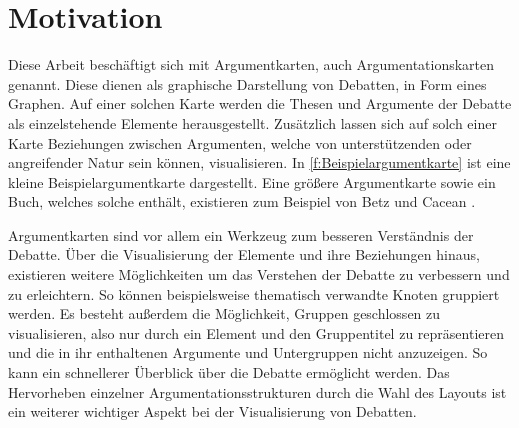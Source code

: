 \chapter{Motivation}
Diese Arbeit beschäftigt sich mit Argumentkarten, auch Argumentationskarten genannt.
Diese dienen als graphische Darstellung von Debatten, in Form eines Graphen.
Auf einer solchen Karte werden die Thesen und Argumente der Debatte als einzelstehende Elemente herausgestellt. 
Zusätzlich lassen sich auf solch einer Karte Beziehungen zwischen Argumenten, welche von unterstützenden oder angreifender Natur sein können, visualisieren.
In \autoref{f:Beispielargumentkarte} ist eine kleine Beispielargumentkarte dargestellt. 
Eine größere Argumentkarte sowie ein Buch, welches solche enthält, existieren zum Beispiel von Betz und Cacean \cite{ClimateEngineering, betz2012ethical}.



Argumentkarten sind vor allem ein Werkzeug zum besseren Verständnis der Debatte. 
Über die Visualisierung der Elemente und ihre Beziehungen hinaus, existieren weitere Möglichkeiten um das Verstehen der Debatte zu verbessern und zu erleichtern.
So können beispielsweise thematisch verwandte Knoten gruppiert werden. 
Es besteht außerdem die Möglichkeit, Gruppen geschlossen zu visualisieren, also nur durch ein
Element und den Gruppentitel zu repräsentieren und  die in ihr enthaltenen Argumente und Untergruppen nicht anzuzeigen. 
So kann ein schnellerer  Überblick über die Debatte ermöglicht werden.
Das Hervorheben einzelner Argumentationsstrukturen durch die Wahl des Layouts ist ein weiterer wichtiger Aspekt bei der Visualisierung von Debatten.

